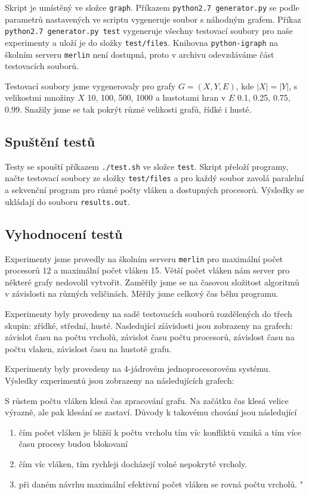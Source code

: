 \documentclass[a4paper, 11pt, titlepage, final]{article}[3. prosinec 2011]
\begin{document}
Skript je umístěný ve složce \texttt{graph}. Příkazem \texttt{python2.7 generator.py} se podle parametrů nastavených ve scriptu vygeneruje soubor s náhodným grafem. Příkaz \texttt{python2.7 generator.py test} vygeneruje všechny testovací soubory pro naše experimenty a uloží je do složky \texttt{test/files}. Knihovna \texttt{python-igraph} na školním serveru \texttt{merlin} není dostupná, proto v archivu odevzdáváme část testovacích souborů.

Testovací soubory jsme vygenerovaly pro grafy $G=(X,Y,E)$, kde $|X|=|Y|$, s velikostmi množiny $X$ 10, 100, 500, 1000 a hustotami hran v $E$ 0.1, 0.25, 0.75, 0.99. Snažily jsme se tak pokrýt různé velikosti grafů, řídké i husté.

\subsection{Spuštění testů}

Testy se spouští příkazem \texttt{./test.sh} ve složce \texttt{test}. Skript přeloží programy, načte testovací soubory ze složky \texttt{test/files} a pro každý soubor zavolá paralelní a sekvenční program pro různé počty vláken a dostupných procesorů. Výsledky se ukládají do souboru \texttt{results.out}.

\subsection{Vyhodnocení testů}

Experimenty jsme provedly na školním serveru \texttt{merlin} pro maximální počet procesorů 12 a maximální počet vláken 15. Větší počet vláken nám server pro některé grafy nedovolil vytvořit. Zaměřily jsme se na časovou složitost algoritmů v závislosti na různých veličinách. Měřily jsme celkový čas běhu programu.



Experimenty byly provedeny na sadě testovacích souborů rozdělených do třech skupin: zřídké, střední, husté. 
Nasledující zíávislosti jsou zobrazeny na grafech: závislot času na počtu vrcholů, závislot času počtu procesorů, závislost času na počtu vlaken, závislost času na hustotě grafu.



Experimenty byly provedeny na 4-jádrovém jednoprocesorovém systému.
Výsledky experimentů jsou zobrazeny na následujících grafech:

S růstem počtu vláken klesá čas zpracování grafu. Na začátku čas klesá velice výrazně, ale pak klesání se zastaví. Důvody k takovému chování jsou následující
\begin{enumerate}
\item čím počet vláken je bližší k počtu vrcholu tím víc konfliktů vzniká a tím více času procesy budou blokovaní
\item čím víc vláken, tím rychleji docházejí volné nepokryté vrcholy.
\item při daném návrhu maximální efektivní počet vláken se rovná počtu vrcholů.
"\end{enumerate}
\end{document}
